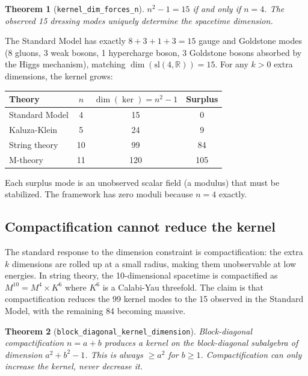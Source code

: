 \documentclass[11pt,letterpaper]{article}
\newtheorem{theorem}{Theorem}
\begin{document}
\begin{theorem}[\texttt{kernel\_dim\_forces\_n}]
\label{thm:kernel15}
$n^2 - 1 = 15$ if and only if $n = 4$.  The observed 15 dressing
modes uniquely determine the spacetime dimension.
\end{theorem}

The Standard Model has exactly $8 + 3 + 1 + 3 = 15$ gauge and
Goldstone modes (8 gluons, 3 weak bosons, 1 hypercharge boson,
3 Goldstone bosons absorbed by the Higgs mechanism), matching
$\dim(\mathrm{sl}(4, \mathbb{R})) = 15$.  For any $k > 0$
extra dimensions, the kernel grows:

\begin{center}
\small
\begin{tabular}{@{}lccc@{}}
\toprule
Theory & $n$ & $\dim(\ker) = n^2 {-} 1$ & Surplus \\
\midrule
Standard Model & 4 & 15 & 0 \\
Kaluza-Klein & 5 & 24 & 9 \\
String theory & 10 & 99 & 84 \\
M-theory & 11 & 120 & 105 \\
\bottomrule
\end{tabular}
\end{center}

\noindent Each surplus mode is an unobserved scalar field (a
modulus) that must be stabilized.  The framework has zero moduli
because $n = 4$ exactly.

\subsection{Compactification cannot reduce the kernel}

The standard response to the dimension constraint is
compactification: the extra $k$ dimensions are rolled up at a
small radius, making them unobservable at low energies.  In
string theory, the 10-dimensional spacetime is compactified as
$M^{10} = M^4 \times K^6$ where $K^6$ is a Calabi-Yau threefold.
The claim is that compactification reduces the 99 kernel modes
to the 15 observed in the Standard Model, with the remaining 84
becoming massive.

\begin{theorem}[\texttt{block\_diagonal\_kernel\_dimension}]
\label{thm:block}
Block-diagonal compactification $n = a + b$ produces a kernel on
the block-diagonal subalgebra of dimension $a^2 + b^2 - 1$.
This is always $\geq a^2$ for $b \geq 1$.  Compactification can
only increase the kernel, never decrease it.
\end{theorem}
\end{document}
